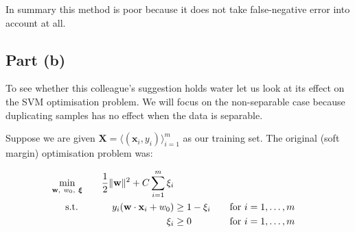 In summary this method is poor because it does not take false-negative error into account at all.

\subsection{Part (b)}

To see whether this colleague's suggestion holds water let us look at its effect on the SVM optimisation problem. We will focus on the non-separable case because duplicating samples has no effect when the data is separable.

Suppose we are given $\mathbf{X}=\langle(\mathbf{x}_i,y_i)\rangle_{i=1}^m$ as our training set. The original (soft margin) optimisation problem was:

\begin{alignat*}{3}
  \min_{\mathbf{w},~w_0,~\boldsymbol\xi}\quad&&\frac{1}{2}\lVert\mathbf{w}\rVert^2 + C\sum_{i=1}^m\xi_i\\
  \text{s.t. }\quad&&y_i(\mathbf{w}\cdot\mathbf{x}_i+w_0) & \geq 1 - \xi_i &&\quad\text{for }i = 1,\ldots,m
  \\ &&\xi_i & \geq 0 &&\quad\text{for }i=1,\ldots,m
\end{alignat*}

